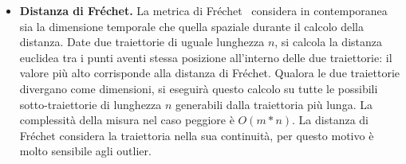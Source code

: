 \begin{itemize}
  \item \textbf{Distanza di Fréchet.}
  La metrica di Fréchet~\cite{khoshaein2013trajectory} considera in contemporanea sia la dimensione temporale
  che quella spaziale durante il calcolo della distanza.
  Date due traiettorie di uguale lunghezza \(n\), si calcola la distanza euclidea tra i punti aventi stessa posizione all'interno delle due traiettorie:
  il valore più alto corrisponde alla distanza di Fréchet.
  Qualora le due traiettorie divergano come dimensioni, si eseguirà questo calcolo su tutte le possibili sotto-traiettorie di lunghezza \(n\) generabili
  dalla traiettoria più lunga.
  La complessità della misura nel caso peggiore è \(O(m*n)\).
  La distanza di Fréchet considera la traiettoria nella sua continuità, per questo motivo è molto sensibile agli outlier.


\end{itemize}



